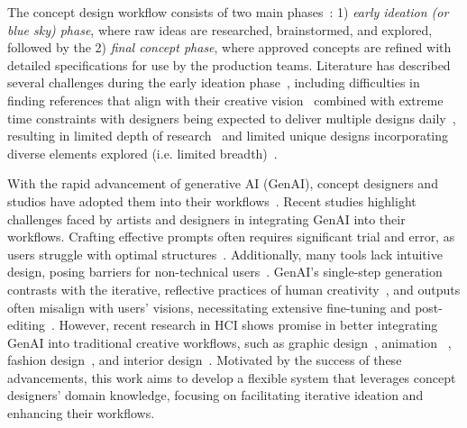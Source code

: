 The concept design workflow consists of two main phases~\cite{bigbadWorld2015, conceptart2018, randomguidebook2023}: 1) \textit{early ideation (or blue sky) phase}, where raw ideas are researched, brainstormed, and explored, followed by the 2) \textit{final concept phase}, where approved concepts are refined with detailed specifications for use by the production teams.
Literature has described several challenges during the early ideation phase~\cite{bigbadWorld2015, 80lv2020, artstation2021, conceptart2018}, including difficulties in finding references that align with their creative vision~\cite{son2024genquery, li2022analyzing, bigbadWorld2015} combined with extreme time constraints with designers being expected to deliver multiple designs daily~\cite{bigbadWorld2015, 80lv2020, artstation2021}, resulting in limited depth of research~\cite{bigbadWorld2015, conceptart2018} and limited unique designs incorporating diverse elements explored (i.e. limited breadth)~\cite{bigbadWorld2015, 80lv2020, interview2020}. 

With the rapid advancement of generative AI (GenAI), concept designers and studios have adopted them into their workflows~\cite{boucher2024resistance, ko2023large, filmhandbook2024, vimpari2023adapt, qin2023does}. Recent studies highlight challenges faced by artists and designers in integrating GenAI into their workflows. Crafting effective prompts often requires significant trial and error, as users struggle with optimal structures~\cite{mahdavi2024ai}. Additionally, many tools lack intuitive design, posing barriers for non-technical users~\cite{shi2023understanding}. GenAI's single-step generation contrasts with the iterative, reflective practices of human creativity~\cite{zhang2024confrontation}, and outputs often misalign with users’ visions, necessitating extensive fine-tuning and post-editing~\cite{mahdavi2024ai, vimpari2023adapt}. However, recent research in HCI shows promise in better integrating GenAI into traditional creative workflows, such as graphic design~\cite{choi2024creativeconnect, son2024genquery}, animation ~\cite{Tseng2024KeyframerEA}, fashion design~\cite{davis2024fashioning, rw29}, and interior design~\cite{wang2024roomdreaming, hou2024c2ideas}. Motivated by the success of these advancements, this work aims to develop a flexible system that leverages concept designers' domain knowledge, focusing on facilitating iterative ideation and enhancing their workflows.

